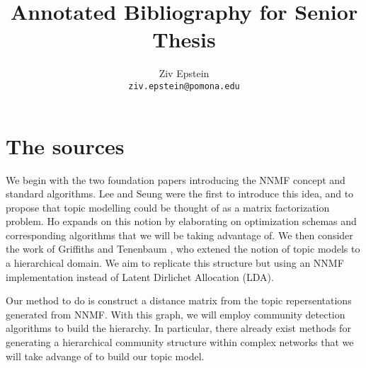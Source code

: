 \documentclass[12pt]{article}
\begin{document}
\nocite{*}

\title{Annotated Bibliography for Senior Thesis}


\author{Ziv Epstein \\ 
	\texttt{ziv.epstein@pomona.edu}}

\maketitle


\section{The sources}
We begin with the two foundation papers introducing the NNMF concept and standard algorithms. Lee and Seung \cite{lee1999learning} were the first to introduce this idea, and to propose that topic modelling could be thought of as a matrix factorization problem. Ho \cite{ho2008nonnegative} expands on this notion by elaborating on optimization schemas and corresponding algorithms that we will be taking advantage of. We then consider the work of Griffiths and Tenenbaum \cite{griffiths2004hierarchical}, who extened the notion of topic models to a hierarchical domain. We aim to replicate this structure but using an NNMF implementation instead of Latent Dirlichet Allocation (LDA). 

Our method to do is construct a distance matrix from the topic repersentations generated from NNMF. With this graph, we will employ community detection algorithms \cite{fortunato2010community} to build the hierarchy. In particular, there already exist methods for generating a hierarchical community structure within complex networks \cite{lancichinetti2009detecting} that we will take advange of to build our topic model.




\end{document}
